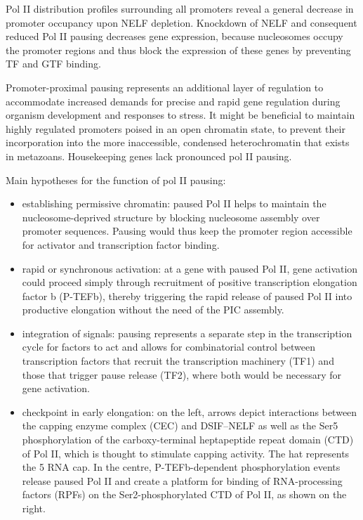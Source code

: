 Pol II distribution profiles surrounding all promoters reveal a general decrease in promoter occupancy upon NELF depletion. Knockdown of NELF and consequent reduced Pol II pausing decreases gene expression, because nucleosomes occupy the promoter regions and thus block the expression of these genes by preventing TF and GTF binding.

Promoter-proximal pausing represents an additional layer of regulation to accommodate increased demands for precise and rapid gene regulation during organism development and responses to stress. It might be beneficial to maintain highly regulated promoters poised in an open chromatin state, to prevent their incorporation into the more inaccessible, condensed heterochromatin that exists in metazoans. Housekeeping genes lack pronounced pol II pausing.

Main hypotheses for the function of pol II pausing:

\begin{itemize}
\tightlist
\item
  establishing permissive chromatin: paused Pol II helps to maintain the nucleosome-deprived structure by blocking nucleosome assembly over promoter sequences. Pausing would thus keep the promoter region accessible for activator and transcription factor binding.
\item
  rapid or synchronous activation: at a gene with paused Pol II, gene activation could proceed simply through recruitment of positive transcription elongation factor b (P-TEFb), thereby triggering the rapid release of paused Pol II into productive elongation without the need of the PIC assembly.
\item
  integration of signals: pausing represents a separate step in the transcription cycle for factors to act and allows for combinatorial control between transcription factors that recruit the transcription machinery (TF1) and those that trigger pause release (TF2), where both would be necessary for gene activation.
\item
  checkpoint in early elongation: on the left, arrows depict interactions between the capping enzyme complex (CEC) and DSIF--NELF as well as the Ser5 phosphorylation of the carboxy-terminal heptapeptide repeat domain (CTD) of Pol II, which is thought to stimulate capping activity. The hat represents the 5 RNA cap. In the centre, P-TEFb-dependent phosphorylation events release paused Pol II and create a platform for binding of RNA-processing factors (RPFs) on the Ser2-phosphorylated CTD of Pol II, as shown on the right.
\end{itemize}


